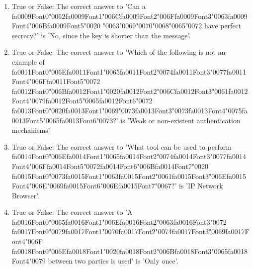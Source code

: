 \documentclass[12pt]{article}
\begin{document}
\begin{enumerate}[label=\arabic*.]
\item True or False: The correct answer to 'Can a {\csname fa0009Font0\endcsname\char"0062}{\csname fa0009Font1\endcsname\char"006C}{\csname fa0009Font2\endcsname\char"006F}{\csname fa0009Font3\endcsname\char"0063}{\csname fa0009Font4\endcsname\char"006B}{\csname fa0009Font5\endcsname\char"0020} {\char"0063}{\char"0069}{\char"0070}{\char"0068}{\char"0065}{\char"0072} have perfect secrecy?' is 'No, since the key is shorter than the message'.
\item True or False: The correct answer to 'Which of the following is not an example of {\csname fa0011Font0\endcsname\char"006E}{\csname fa0011Font1\endcsname\char"0065}{\csname fa0011Font2\endcsname\char"0074}{\csname fa0011Font3\endcsname\char"0077}{\csname fa0011Font4\endcsname\char"006F}{\csname fa0011Font5\endcsname\char"0072} {\csname fa0012Font0\endcsname\char"006B}{\csname fa0012Font1\endcsname\char"0020}{\csname fa0012Font2\endcsname\char"006C}{\csname fa0012Font3\endcsname\char"0061}{\csname fa0012Font4\endcsname\char"0079}{\csname fa0012Font5\endcsname\char"0065}{\csname fa0012Font6\endcsname\char"0072} {\csname fa0013Font0\endcsname\char"0020}{\csname fa0013Font1\endcsname\char"0069}{\char"0073}{\csname fa0013Font3\endcsname\char"0073}{\csname fa0013Font4\endcsname\char"0075}{\csname fa0013Font5\endcsname\char"0065}{\csname fa0013Font6\endcsname\char"0073}?' is 'Weak or non-existent authentication mechanisms'.
\item True or False: The correct answer to 'What tool can be used to perform {\csname fa0014Font0\endcsname\char"006E}{\csname fa0014Font1\endcsname\char"0065}{\csname fa0014Font2\endcsname\char"0074}{\csname fa0014Font3\endcsname\char"0077}{\csname fa0014Font4\endcsname\char"006F}{\csname fa0014Font5\endcsname\char"0072}{\csname fa0014Font6\endcsname\char"006B}{\csname fa0014Font7\endcsname\char"0020} {\csname fa0015Font0\endcsname\char"0073}{\csname fa0015Font1\endcsname\char"0063}{\csname fa0015Font2\endcsname\char"0061}{\csname fa0015Font3\endcsname\char"006E}{\csname fa0015Font4\endcsname\char"006E}{\char"0069}{\csname fa0015Font6\endcsname\char"006E}{\csname fa0015Font7\endcsname\char"0067}?' is 'IP Network Browser'.
\item True or False: The correct answer to 'A {\csname fa0016Font0\endcsname\char"0065}{\csname fa0016Font1\endcsname\char"006E}{\csname fa0016Font2\endcsname\char"0063}{\csname fa0016Font3\endcsname\char"0072} {\csname fa0017Font0\endcsname\char"0079}{\csname fa0017Font1\endcsname\char"0070}{\csname fa0017Font2\endcsname\char"0074}{\csname fa0017Font3\endcsname\char"0069}{\csname fa0017Font4\endcsname\char"006F} {\csname fa0018Font0\endcsname\char"006E}{\csname fa0018Font1\endcsname\char"0020}{\csname fa0018Font2\endcsname\char"006B}{\csname fa0018Font3\endcsname\char"0065}{\csname fa0018Font4\endcsname\char"0079} between two parties is used' is 'Only once'.

\end{enumerate}
\end{document}

